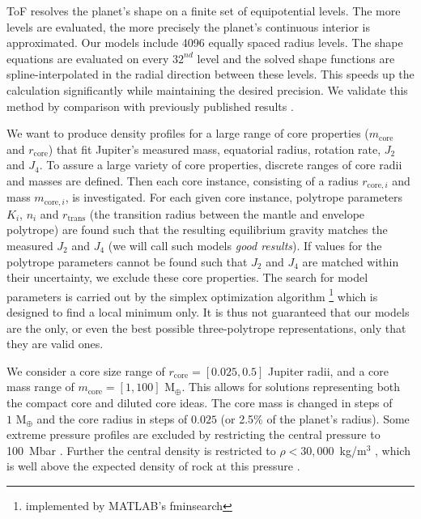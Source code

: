 \documentclass[usenatbib]{mnras}
\newcommand{\sub}[1]{_{\text{#1}}}
\begin{document}
ToF resolves the planet's shape on a finite set of equipotential levels. The more levels are evaluated, the more precisely the planet's continuous interior is approximated. Our models include 4096 equally spaced radius levels. The shape equations are evaluated on every $32^{nd}$ level and the solved shape functions are spline-interpolated in the radial direction between these levels. This speeds up the calculation significantly while maintaining the desired precision. We validate this method by comparison with previously published results
\citep{Nettelmann_2017}. 

We want to produce density profiles for a large range of core properties ($m\sub{core}$ and $r\sub{core}$) that fit Jupiter's measured mass, equatorial radius, rotation rate, $J_2$ and $J_4$. To assure a large variety of core properties, discrete ranges of core radii and masses are defined. Then each core instance, consisting of a radius $r_{\text{core}, i}$ and mass $m_{\text{core}, i}$, is investigated.
For each given core instance, polytrope parameters $K_{i}$, $n_i$ and $r\sub{trans}$ (the transition radius between the mantle and envelope polytrope) are found such that the resulting equilibrium gravity matches the measured $J_2$ and $J_4$ (we will call such models \textit{good results}). If values for the polytrope parameters cannot be found such that $J_2$ and $J_4$ are matched within their uncertainty, we exclude these core properties. 
The search for model parameters is carried out by the simplex optimization algorithm \citep{Lagrias1998} \footnote{implemented by MATLAB's fminsearch} which is designed to find a local minimum only. It is thus not guaranteed that our models are the only, or even the best possible three-polytrope representations, only that they are valid ones.

We consider a core size range of $r\sub{core} = [0.025, 0.5]$ Jupiter radii, and a core mass range of $m\sub{core} = [1, 100] \text{ M}_{\oplus}$. This allows for solutions representing both the compact core and diluted core ideas.
The core mass is changed in steps of $1 \text{ M}_\oplus$ and the core radius in steps of $0.025$ (or 2.5\% of the planet's radius). Some extreme pressure profiles are excluded by restricting the central pressure to 100~Mbar \citep{Miguel2016,Debras_2019, 2017Wahl}. 
Further the central density is restricted to $\rho < 30,000$~kg/m$^3$ \citep{Helled2011_jup, Ni2018}, which is well above the expected density of rock at this pressure \citep{sesame7100, Musella2019,Thompson1974}.
\end{document}
